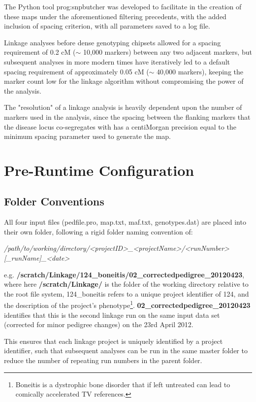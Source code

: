 The Python tool \gls{prog:snpbutcher} was developed to facilitate in the creation of these maps under the aforementioned filtering precedents, with the added inclusion of spacing criterion, with all parameters saved to a log file. 

Linkage analyses before dense genotyping chipsets allowed for a spacing requirement of 0.2 cM ($\sim$ 10,000 markers) between any two adjacent markers, but subsequent analyses in more modern times have iteratively led to a default spacing requirement of approximately 0.05 cM ($\sim$ 40,000 markers), keeping the marker count low for the linkage algorithm without compromising the power of the analysis.

The "resolution" of a linkage analysis is heavily dependent upon the number of markers used in the analysis, since the spacing between the flanking markers that the disease locus co-segregates with has a centiMorgan precision equal to the minimum spacing parameter used to generate the map.


\section{Pre-Runtime Configuration}

\subsection{Folder Conventions}\label{ref:meth:foldconv}

All four input files (pedfile.pro, map.txt, maf.txt, genotypes.dat) are placed into their own folder, following a rigid folder naming convention of: 

\textit{\footnotesize /path/to/working/directory/<projectID>\_<projectName>/<runNumber>[\_runName]\_<date>}

e.g. {\bf\footnotesize /scratch/Linkage/124\_boneitis/02\_correctedpedigree\_20120423}, where here {\bf\footnotesize /scratch/Linkage/} is the folder of the working directory relative to the root file system, 124\_boneitis refers to a unique project identifier of 124, and the description of the project's phenotype\footnote{Boneitis is a dystrophic bone disorder that if left untreated can lead to comically accelerated TV references.}. {{\bf\footnotesize 02\_correctedpedigree\_20120423} identifies that this is the second linkage run on the same input data set (corrected for minor pedigree changes) on the 23rd April 2012.}

This ensures that each linkage project is uniquely identified by a project identifier, such that subsequent analyses can be run in the same master folder to reduce the number of repeating run numbers in the parent folder.

